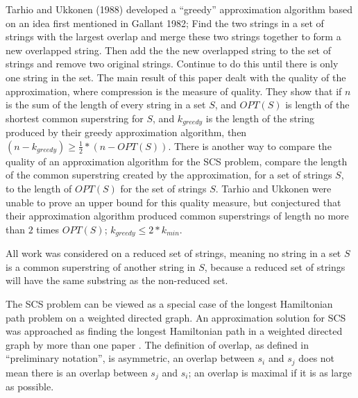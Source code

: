 \documentclass[letterpaper,11pt,titlepage]{article}
\begin{document}
Tarhio and Ukkonen (1988) developed a ``greedy'' approximation algorithm based on an idea first mentioned in Gallant 1982; Find the two strings in a set of strings with the largest overlap and merge these two strings together to form a new overlapped string.  Then add the the new overlapped string to the set of strings and remove two original strings.  Continue to do this until there is only one string in the set.  The main result of this paper dealt with the quality of the approximation, where compression is the measure of quality.  They show that if $n$ is the sum of the length of every string in a set $S$, and $OPT(S)$ is length of the shortest common superstring for $S$, and $k_{greedy}$ is the length of the string produced by their greedy approximation algorithm, then $(n - k_{greedy}) \geq \frac{1}{2}*(n - OPT(S))$.  There is another way to compare the quality of an approximation algorithm for the SCS problem, compare the length of the common superstring created by the approximation, for a set of strings $S$, to the length of $OPT(S)$ for the set of strings $S$.  Tarhio and Ukkonen were unable to prove an upper bound for this quality measure, but conjectured that their approximation algorithm produced common superstrings  of length no more than $2$ times $OPT(S)$; $k_{greedy} \leq 2*k_{min}$.

All work was considered on a reduced set of strings, meaning no string in a set $S$ is a common superstring of another string in $S$, because a reduced set of strings will have the same substring as the non-reduced set.

The SCS problem can be viewed as a special case of the longest Hamiltonian path problem on a weighted directed graph. An approximation solution for SCS was approached as finding the longest Hamiltonian path in a weighted directed graph by more than one paper \cite{tarhio1988greedy} \cite{turner1989approximation}. The definition of overlap, as defined in ``preliminary notation'',  is asymmetric, an overlap between $s_i$ and $s_j$ does not mean there is an overlap between $s_j$ and $s_i$;  an overlap is maximal if it is as large as possible. 
\end{document}
